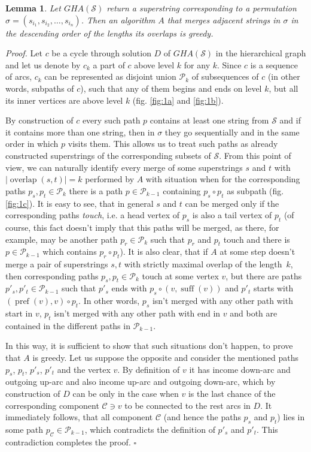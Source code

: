 \documentclass[11pt]{article}
\newtheorem{lem}{Lemma}
\DeclareMathOperator{\suff}{suff}
\DeclareMathOperator{\pref}{pref}
\DeclareMathOperator{\overlap}{overlap}
\begin{document}
	\begin{lem}
		Let $GHA(\mathcal{S})$ return a superstring corresponding to a permutation $\sigma = (s_{i_1}, s_{i_2}, \dots, s_{i_n})$. Then an algorithm $A$ that merges adjacent strings in $\sigma$ in the descending order of the lengths its overlaps is greedy.
	\end{lem}
	{\em Proof.} Let $c$ be a cycle through solution $D$ of $GHA(\mathcal{S})$ in the hierarchical graph and let us denote by $c_k$ a part of $c$ above level $k$ for any $k$. Since $c$ is a sequence of arcs, $c_k$ can be represented as disjoint union $\mathcal{P}_k$ of subsequences of $c$ (in other words, subpaths of $c$), such that any of them begins and ends on level $k$, but all its inner vertices are above level $k$ (fig. \ref{fig:1a} and \ref{fig:1b}).
	
	By construction of $c$ every such path $p$ contains at least one string from $\mathcal{S}$ and if it contains more than one string, then in $\sigma$ they go sequentially and in the same order in which $p$ visits them. This allows us to treat such paths as already constructed superstrings of the corresponding subsets of $\mathcal{S}$. From this point of view, we can naturally identify every merge of  some superstrings $s$ and $t$ with $|\overlap(s,t)| = k$ performed by $A$ with situation when for the corresponding paths $p_s, p_t \in \mathcal{P}_k$ there is a path $p \in \mathcal{P}_{k-1}$ containing $p_s \circ p_t$ as subpath (fig. \ref{fig:1c}). It is easy to see, that in general $s$ and $t$ can be merged only if the corresponding paths {\em touch}, i.e. a head vertex of $p_s$ is also a tail vertex of  $p_t$ (of course, this fact doesn't imply that this paths will be merged, as there, for example, may be another path $p_r \in \mathcal{P}_k$ such that $p_r$ and $p_t$ touch and there is $p \in \mathcal{P}_{k-1}$ which contains $p_r \circ p_t$). It is also clear, that if $A$ at some step doesn't merge a pair of superstrings $s, t$ with strictly maximal overlap of the length~$k$, then corresponding paths $p_s, p_t \in \mathcal{P}_k$ touch at some vertex $v$, but there are paths $p'_s, p'_t \in \mathcal{P}_{k-1}$ such that $p'_s$ ends with $p_s \circ (v, \suff(v))$ and $p'_t$ starts with $(\pref(v), v) \circ p_t$. In other words, $p_s$ isn't merged with any other path with start in $v$, $p_t$ isn't merged with any other path with end in $v$ and both are contained in the different paths in $\mathcal{P}_{k-1}$.
	
	In this way, it is sufficient to show that such situations don't happen, to prove that $A$ is greedy. Let us suppose the opposite and consider the mentioned paths $p_s$, $p_t$, $p'_s$, $p'_t$ and the vertex $v$. By definition of $v$ it has income down-arc and outgoing up-arc and also income up-arc and outgoing down-arc, which by construction of $D$ can be only in the case when $v$ is the last chance of the corresponding component $\mathcal{C} \ni v$ to be connected to the rest arcs in $D$. It immediately follows, that all component $\mathcal{C}$ (and hence the paths  $p_s$ and $p_t$) lies in some path $p_{\mathcal{C}} \in \mathcal{P}_{k-1}$, which contradicts the definition of $p'_s$ and $p'_t$. This contradiction completes the proof. $\square$
	
\end{document}

